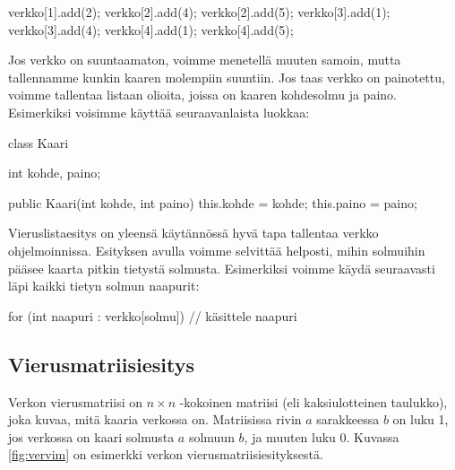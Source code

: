 \begin{code}
verkko[1].add(2);
verkko[2].add(4);
verkko[2].add(5);
verkko[3].add(1);
verkko[3].add(4);
verkko[4].add(1);
verkko[4].add(5);
\end{code}

Jos verkko on suuntaamaton, voimme menetellä muuten samoin,
mutta tallennamme kunkin kaaren molempiin suuntiin.
Jos taas verkko on painotettu, voimme tallentaa listaan
olioita, joissa on kaaren kohdesolmu ja paino.
Esimerkiksi voisimme käyttää seuraavanlaista luokkaa:

\begin{code}
class Kaari {
    int kohde, paino;

    public Kaari(int kohde, int paino) {
        this.kohde = kohde;
        this.paino = paino;
    }
}
\end{code}

Vieruslistaesitys on yleensä käytännössä hyvä tapa
tallentaa verkko ohjelmoinnissa.
Esityksen avulla voimme selvittää helposti,
mihin solmuihin pääsee kaarta pitkin tietystä solmusta.
Esimerkiksi voimme käydä seuraavasti läpi
kaikki tietyn solmun naapurit:

\begin{code}
for (int naapuri : verkko[solmu]) {
    // käsittele naapuri
}
\end{code}

\subsection{Vierusmatriisiesitys}

Verkon vierusmatriisi on $n \times n$ -kokoinen matriisi
(eli kaksiulotteinen taulukko), joka kuvaa, mitä kaaria verkossa on.
Matriisissa rivin $a$ sarakkeessa $b$ on luku 1,
jos verkossa on kaari solmusta $a$ solmuun $b$,
ja muuten luku 0.
Kuvassa \ref{fig:vervim} on esimerkki verkon
vierusmatriisiesityksestä.

